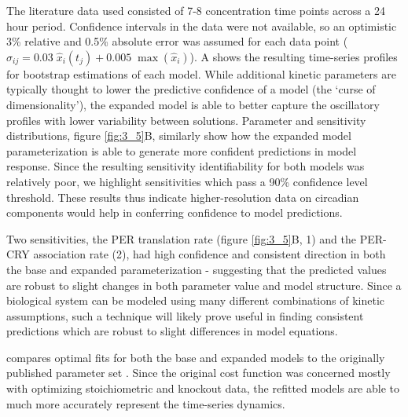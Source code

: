 {The literature data used consisted of 7-8 concentration time points across a 24 hour period. 
Confidence intervals in the data were not available, so an optimistic 3\% relative and 0.5\% absolute error was assumed for each data point ($\sigma_{ij} = 0.03\;\hat{x}_{i}(t_j) + 0.005\;\max(\hat{x}_i)$). 
A shows the resulting time-series profiles for bootstrap estimations of each model. 
While additional kinetic parameters are typically thought to lower the predictive confidence of a model (the `curse of dimensionality'), the expanded model is able to better capture the oscillatory profiles with lower variability between solutions. 
Parameter and sensitivity distributions, figure \ref{fig:3_5}B, similarly show how the expanded model parameterization is able to generate more confident predictions in model response. 
Since the resulting sensitivity identifiability for both models was relatively poor, we highlight sensitivities which pass a 90\% confidence level threshold. 
These results thus indicate higher-resolution data on circadian components would help in conferring confidence to model predictions.

Two sensitivities, the PER translation rate (figure \ref{fig:3_5}B, 1) and the PER-CRY association rate (2), had high confidence and consistent direction in both the base and expanded parameterization - suggesting that the predicted values are robust to slight changes in both parameter value and model structure. 
Since a biological system can be modeled using many different combinations of kinetic assumptions, such a technique will likely prove useful in finding consistent predictions which are robust to slight differences in model equations.

 compares optimal fits for both the base and expanded models to the originally published parameter set \cite{Hirota2012}. 
Since the original cost function was concerned mostly with optimizing stoichiometric and knockout data, the refitted models are able to much more accurately represent the time-series dynamics. 

}
